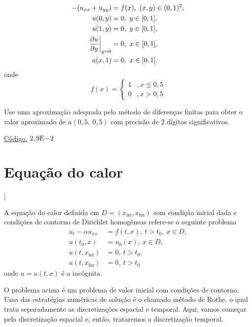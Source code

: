 \begin{exer}
  \begin{align}
    -(u_{xx} + u_{yy}) &= f(x),~(x, y)\in (0, 1)^2,\\
    u(0, y) &= 0,~y\in [0, 1],\\
    u(1, y) &= 0,~y\in [0, 1],\\
    \left.\frac{\partial u}{\partial y}\right|_{y=0} &= 0,~x\in [0, 1],\\
    u(x, 1) &= 0,~x\in [0, 1].
\end{align}
onde
\begin{equation}
  f(x) = \left\{
    \begin{array}{ll}
      1 &, x\leq 0,5\\
      0 &, x>0,5
    \end{array}
  \right.
\end{equation}
\end{exer}
Use uma aproximação adequada pelo método de diferenças finitas para obter o valor aproximado de $u(0,5,~0,5)$ com precisão de $2$ dígitos significativos.
\begin{resp}
  \ifisoctave  \href{https://github.com/phkonzen/notas/blob/master/src/MatematicaNumerica/cap_edp/dados/exer_edp_Poisson_1/exer_edp_Poisson_1.m}{Código.} 
  \fi
  $2,9\mathrm{E}\!-\!2$
\end{resp}

\section{Equação do calor}\label{cap_edp_sec_calor}

\begin{flushleft}
  [[tag:revisar]]
\end{flushleft}

A equação do calor definida em  $D = (x_{\text{ini}}, x_{\text{fin}})$ com condição inicial dada e condições de contorno de Dirichlet homogêneas refere-se o seguinte problema
\begin{align}
  u_t - \alpha u_{xx} &= f(t,x),~t>t_0,~x\in D, \label{eq:edp_calor_eq}\\
  u(t_0,x) &= u_0(x),~x\in D,\label{eq:edp_calor_ci}\\
  u(t, x_{\text{ini}}) &= 0,~t>t_0,\label{eq:edp_calor_bcxini}\\
  u(t, x_{\text{fin}}) &= 0,~t>t_0\label{eq:edp_calor_bcxfin}
\end{align}
onde $u = u(t,x)$ é a incógnita.

O problema acima é um problema de valor inicial com condições de contorno. Uma das estratégias numéricas de solução é o chamado método de Rothe, o qual trata separadamente as discretizações espacial e temporal. Aqui, vamos começar pela discretização espacial e, então, trataremos a discretização temporal.

